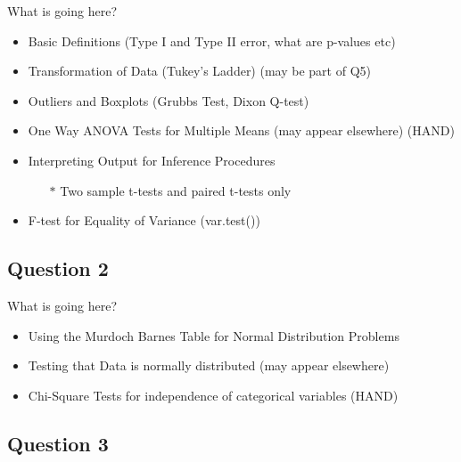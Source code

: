 \documentclass[a4paper,12pt]{article}
\begin{document}
\begin{framed}
What is going here?
\begin{itemize}
\item Basic Definitions (Type I and Type II error, what are p-values etc)
\item Transformation of Data (Tukey's Ladder) (may be part of Q5)
\item Outliers and Boxplots (Grubbs Test, Dixon Q-test)
\item One Way ANOVA Tests for Multiple Means (may appear elsewhere) (HAND)
\item Interpreting Output for Inference Procedures
	\begin{itemize}
		\item[$\ast$] Two sample t-tests and paired t-tests only
	\end{itemize}
\item F-test for Equality of Variance (var.test())
\end{itemize}
\end{framed}

\newpage
\subsection*{Question 2}
\begin{framed}
	What is going here?
	\begin{itemize}

		\item Using the Murdoch Barnes Table for Normal Distribution Problems
		\item Testing that Data is normally distributed (may appear elsewhere)
		\item Chi-Square Tests for independence of categorical variables (HAND)

	\end{itemize}
\end{framed}
\newpage
\subsection*{Question 3}
\end{document}
